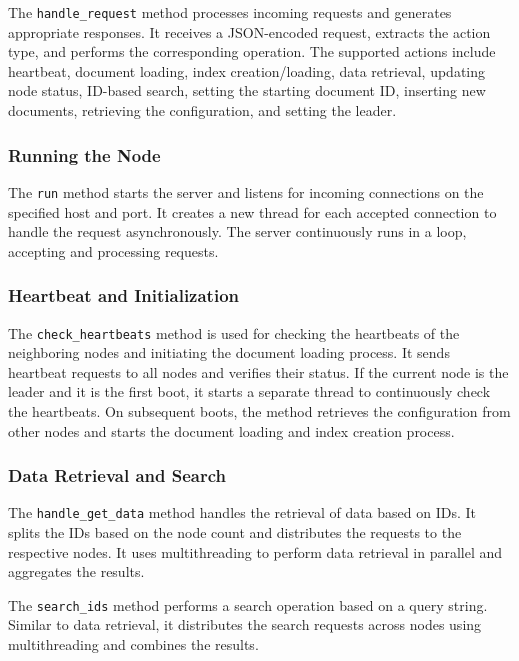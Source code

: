 \documentclass{article}
\begin{document}
The \texttt{handle\_request} method processes incoming requests and generates appropriate 
responses. It receives a JSON-encoded request, extracts the action type, and performs the 
corresponding operation. The supported actions include heartbeat, document loading, index 
creation/loading, data retrieval, updating node status, ID-based search, setting the starting 
document ID, inserting new documents, retrieving the configuration, and setting the leader.

\subsubsection*{Running the Node}

The \texttt{run} method starts the server and listens for incoming connections on the specified 
host and port. It creates a new thread for each accepted connection to handle the request 
asynchronously. The server continuously runs in a loop, accepting and processing requests.


\subsubsection*{Heartbeat and Initialization}

The \texttt{check\_heartbeats} method is used for checking the heartbeats of the neighboring 
nodes and initiating the document loading process. It sends heartbeat requests to all nodes and 
verifies their status. If the current node is the leader and it is the first boot, it starts a 
separate thread to continuously check the heartbeats. On subsequent boots, the method retrieves 
the configuration from other nodes and starts the document loading and index creation process.

\subsubsection*{Data Retrieval and Search}

The \texttt{handle\_get\_data} method handles the retrieval of data based on IDs. It splits the 
IDs based on the node count and distributes the requests to the respective nodes. It uses 
multithreading to perform data retrieval in parallel and aggregates the results.

The \texttt{search\_ids} method performs a search operation based on a query string. Similar to 
data retrieval, it distributes the search requests across nodes using multithreading and 
combines the results.
\end{document}
